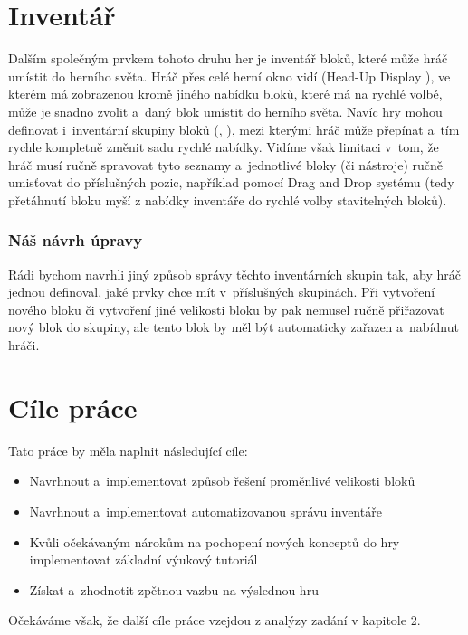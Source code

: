 \section{Inventář}
Dalším společným prvkem tohoto druhu her je inventář bloků, které může hráč umístit do herního světa. Hráč přes celé herní okno vidí \HUD{} (Head-Up Display \citep{hud_terminology}), ve kterém má zobrazenou kromě jiného nabídku bloků, které má na rychlé volbě, může je snadno zvolit a~daný blok umístit do herního světa. Navíc hry mohou definovat i~inventární skupiny bloků (\SE{}, \ME{}), mezi kterými hráč může přepínat a~tím rychle kompletně změnit sadu rychlé nabídky. Vidíme však limitaci v~tom, že hráč musí ručně spravovat tyto seznamy a~jednotlivé bloky (či nástroje) ručně umisťovat do příslušných pozic, například pomocí Drag and Drop systému (tedy přetáhnutí bloku myší z nabídky inventáře do rychlé volby stavitelných bloků).


\subsubsection{Náš návrh úpravy}
Rádi bychom navrhli jiný způsob správy těchto inventárních skupin tak, aby hráč jednou definoval, jaké prvky chce mít v~příslušných skupinách. Při vytvoření nového bloku či vytvoření jiné velikosti bloku by pak nemusel ručně přiřazovat nový blok do skupiny, ale tento blok by měl být automaticky zařazen a~nabídnut hráči.  


\section{Cíle práce}
Tato práce by měla naplnit následující cíle:
\begin{itemize}
	\item Navrhnout a~implementovat způsob řešení proměnlivé velikosti bloků
	\item Navrhnout a~implementovat automatizovanou správu inventáře
	\item Kvůli očekávaným nárokům na pochopení nových konceptů do hry implementovat základní výukový tutoriál
	\item Získat a~zhodnotit zpětnou vazbu na výslednou hru
\end{itemize}
Očekáváme však, že další cíle práce vzejdou z analýzy zadání v kapitole 2.

